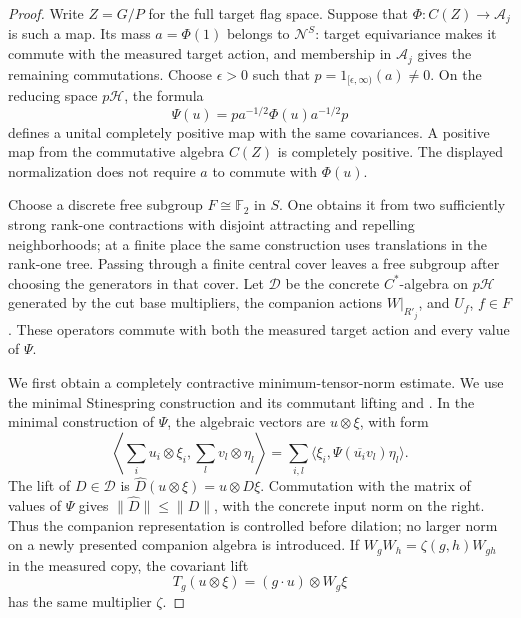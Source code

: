 \begin{proof}
Write \(Z=G/P\) for the full target flag space. Suppose that
\(\Phi:C(Z)\to\mathcal A_j\) is such a map. Its mass
\(a=\Phi(1)\) belongs to \(\mathcal N^S\): target equivariance makes
it commute with the measured target action, and membership in
\(\mathcal A_j\) gives the remaining commutations. Choose
\(\epsilon>0\) such that
\(p=1_{[\epsilon,\infty)}(a)\ne0\). On the reducing space
\(p\mathcal H\), the formula
\[
 \Psi(u)=p a^{-1/2}\Phi(u)a^{-1/2}p
\]
defines a unital completely positive map with the same covariances.
A positive map from the commutative algebra \(C(Z)\) is completely
positive. The displayed normalization does not require \(a\) to
commute with \(\Phi(u)\).

Choose a discrete free subgroup \(F\cong\mathbb F_2\) in \(S\).
One obtains it from two sufficiently strong rank-one contractions with
disjoint attracting and repelling neighborhoods; at a finite place the
same construction uses translations in the rank-one tree. Passing
through a finite central cover leaves a free subgroup after choosing
the generators in that cover. Let \(\mathcal D\) be the concrete
\(C^*\)-algebra on \(p\mathcal H\) generated by the cut base
multipliers, the companion actions \(W|_{R'_j}\), and
\(U_f\), \(f\in F\). These operators commute with both the measured
target action and every value of \(\Psi\).

We first obtain a completely contractive minimum-tensor-norm estimate.
We use the minimal Stinespring construction and its commutant lifting
\cite{Stinespring1955} and \cite[Theorems~1.1.1 and~1.3.1]{Arveson1969}.
In the minimal construction of \(\Psi\), the algebraic
vectors are \(u\otimes\xi\), with form
\[
 \left\langle\sum_i u_i\otimes\xi_i,
                  \sum_l v_l\otimes\eta_l\right\rangle
 =\sum_{i,l}\langle\xi_i,\Psi(\overline{u_i}v_l)\eta_l\rangle.
\]
The lift of \(D\in\mathcal D\) is
\(\widehat D(u\otimes\xi)=u\otimes D\xi\).
Commutation with the matrix of values of \(\Psi\) gives
\(\|\widehat D\|\leq\|D\|\), with the concrete input norm on
the right. Thus the companion representation is controlled before
dilation; no larger norm on a newly presented companion algebra is
introduced. If \(W_gW_h=\zeta(g,h)W_{gh}\) in the measured copy,
the covariant lift
\[
 T_g(u\otimes\xi)=(g\cdot u)\otimes W_g\xi
\]
has the same multiplier \(\zeta\).


\end{proof}
